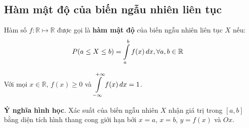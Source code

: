 \subsection*{Hàm mật độ của biến ngẫu nhiên liên tục}

\begin{definition}
    Hàm số $f: \mathbb{R} \mapsto \mathbb{R}$ được gọi là \textbf{hàm mật độ} của biến ngẫu nhiên liên tục $X$ nếu: \[P(a \leq X \leq b) = \displaystyle{\int\displaylimits_a^b f(x)\,dx}, \forall a, b \in \mathbb{R}\]
\end{definition}

\begin{remark}
    Với mọi $x \in \mathbb{R}$, $f(x) \geq 0$ và $\displaystyle{\int\displaylimits_{-\infty}^{+\infty}f(x)\,dx = 1}$.
\end{remark}

\textbf{Ý nghĩa hình học}. Xác suất của biến ngẫu nhiên $X$ nhận giá trị trong $[a, b]$ bằng diện tích hình thang cong giới hạn bởi $x=a$, $x=b$, $y=f(x)$ và $Ox$.
